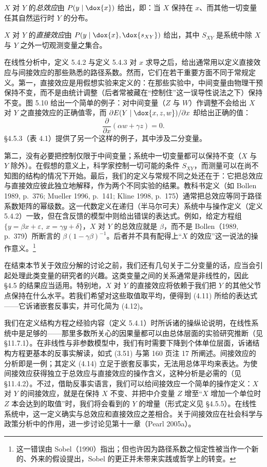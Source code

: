 \begin{definition}[总效应]
$X$ 对 $Y$ 的\emph{总效应}由 $P(y\mid \dox{x})$ 给出，即：当 $X$ 保持在 $x$、而其他一切变量任其自然运行时 $Y$ 的分布。
\end{definition}

\begin{definition}[直接效应]
$X$ 对 $Y$ 的\emph{直接效应}由 $P(y\mid \dox{x},\dox{s_{XY}})$ 给出，其中 $S_{XY}$ 是系统中除 $X$ 与 $Y$ 之外一切观测变量之集合。
\end{definition}

在线性分析中，定义 5.4.2 与定义 5.4.3 对 $x$ 求导之后，给出通常用以定义直接效应与间接效应的那些熟悉的路径系数。然而，它们在若干重要方面不同于常规定义。第一，直接效应是用假想实验来定义的：在那些实验中，中间变量由物理干预保持不变，而不是由统计调整（后者常被藏在“控制住”这一误导性说法之下）保持不变。图 5.10 给出一个简单的例子：对中间变量（$Z$ 与 $W$）作调整不会给出 $X$ 对 $Y$ 之直接效应的正确值零，而 $\partial E(Y\mid \dox{x,z,w})/\partial x$ 却给出正确的值：
\[
\frac{\partial}{\partial x}(\alpha w+\gamma z)=0.
\]
\S 4.5.3（表 4.1）提供了另一个这样的例子，其中涉及二分变量。

第二，没有必要把控制仅限于中间变量；系统中一切变量都可以保持不变（$X$ 与 $Y$ 除外）。在假想的意义上，科学家控制一切可能的条件 $S_{XY}$，而测量可以在尚不知图的结构的情况下开始。最后，我们的定义与常规不同之处还在于：它把总效应与直接效应彼此独立地解释，作为两个不同实验的结果。教科书定义（如 Bollen 1989, p.~376; Mueller 1996, p.~141; Kline 1998, p.~175）通常把总效应等同于路径系数矩阵的幂级数。这一代数定义在递归（半马尔可夫）系统中与操作定义（定义 5.4.2）一致，但在含反馈的模型中则给出错误的表达式。例如，给定方程组 $\{y=\beta x+\varepsilon,\ x=\gamma y+\delta\}$，$X$ 对 $Y$ 的总效应就是 $\beta$，而不是 Bollen（1989, p.~379）所断言的 $\beta(1-\gamma\beta)^{-1}$。后者并不具有配得上“$X$ 的效应”这一说法的操作意义。\footnote{这一错误由 Sobel（1990）指出；但也许因为路径系数之恒定性被当作一个新的、外来的假设提出，Sobel 的更正并未带来实践或哲学上的转变。}

在结束本节关于效应分解的讨论之前，我们还有几句关于二分变量的话，应当会引起处理此类变量的研究者的兴趣。这类变量之间的关系通常是非线性的，因此 \S 4.5 的结果应当适用。特别地，$X$ 对 $Y$ 的直接效应将依赖于我们把 $Y$ 的其他父节点保持在什么水平。若我们希望对这些取值取平均，便得到 \textup{(4.11)} 所给的表达式——它诉诸嵌套反事实，并可化简为 \textup{(4.12)}。

我们在定义结构方程之经验内容（定义 5.4.1）时所诉诸的操纵论说明，在线性系统中是足够的——那里多数所关心的因果量都可以由总体层面的实验研究推断（见 \S 11.7.1）。在非线性与非参数模型中，我们有时需要下降到个体单位层面，诉诸结构方程更基本的反事实解读，如式 \textup{(3.51)} 与第 160 页注 17 所阐述。间接效应的分析即是一例；其定义 \textup{(4.14)} 立足于嵌套反事实，无法用总体平均来表达。为使间接效应获得独立于总效应与直接效应的操作含义，这种分析是必需的（见 \S 11.4.2）。不过，借助反事实语言，我们可以给间接效应一个简单的操作定义：$X$ 对 $Y$ 的间接效应，就是在保持 $X$ 不变、并把中介变量 $Z$ 增至“$X$ 增加一个单位时 $Z$ 本会达到的取值”时，我们将会看到的 $Y$ 的增量（形式定义见 \S 4.5.5）。在线性系统中，这一定义确实与总效应和直接效应之差相合。关于间接效应在社会科学与政策分析中的作用，进一步讨论见第十一章（Pearl 2005a）。

